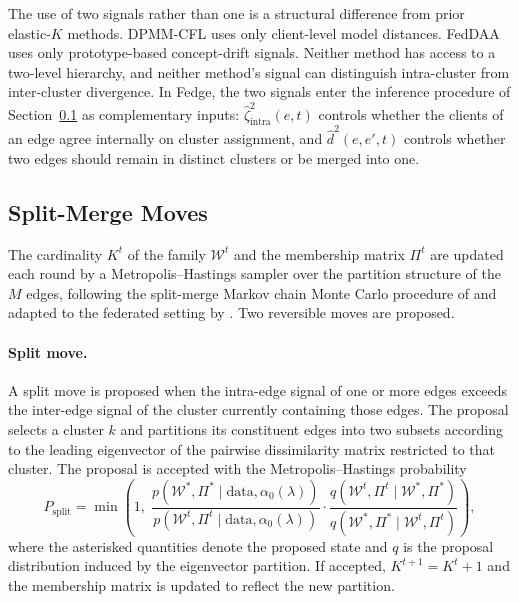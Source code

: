 The use of two signals rather than one is a structural difference from prior elastic-$K$ methods. DPMM-CFL \cite{jaramillo2026dpmmcfl} uses only client-level model distances. FedDAA \cite{peng2025feddaa} uses only prototype-based concept-drift signals. Neither method has access to a two-level hierarchy, and neither method's signal can distinguish intra-cluster from inter-cluster divergence. In Fedge, the two signals enter the inference procedure of Section~\ref{subsec:fedge-mh} as complementary inputs: $\hat{\zeta}_{\text{intra}}^{2}(e, t)$ controls whether the clients of an edge agree internally on cluster assignment, and $\hat{d}^{2}(e, e', t)$ controls whether two edges should remain in distinct clusters or be merged into one.

\subsection{Split-Merge Moves}
\label{subsec:fedge-mh}

The cardinality $K^t$ of the family $\mathcal{W}^t$ and the membership matrix $\Pi^t$ are updated each round by a Metropolis--Hastings sampler over the partition structure of the $M$ edges, following the split-merge Markov chain Monte Carlo procedure of \cite{jain2004split} and adapted to the federated setting by \cite{jaramillo2026dpmmcfl}. Two reversible moves are proposed.

\paragraph{Split move.}
A split move is proposed when the intra-edge signal of one or more edges exceeds the inter-edge signal of the cluster currently containing those edges. The proposal selects a cluster $k$ and partitions its constituent edges into two subsets according to the leading eigenvector of the pairwise dissimilarity matrix restricted to that cluster. The proposal is accepted with the Metropolis--Hastings probability
\begin{equation}
\label{eq:mh-split}
P_{\text{split}} = \min\!\left( 1, \; \frac{p(\mathcal{W}^{*}, \Pi^{*} \mid \text{data}, \alpha_0(\lambda))}{p(\mathcal{W}^{t}, \Pi^{t} \mid \text{data}, \alpha_0(\lambda))} \cdot \frac{q(\mathcal{W}^{t}, \Pi^{t} \mid \mathcal{W}^{*}, \Pi^{*})}{q(\mathcal{W}^{*}, \Pi^{*} \mid \mathcal{W}^{t}, \Pi^{t})} \right),
\end{equation}
where the asterisked quantities denote the proposed state and $q$ is the proposal distribution induced by the eigenvector partition. If accepted, $K^{t+1} = K^t + 1$ and the membership matrix is updated to reflect the new partition.

